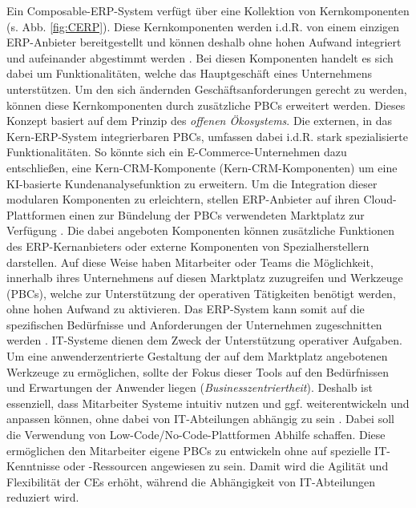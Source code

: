 Ein Composable-ERP-System verfügt über eine Kollektion von Kernkomponenten (s. Abb. \ref{fig:CERP}). Diese Kernkomponenten werden i.d.R. von einem einzigen ERP-Anbieter bereitgestellt und können deshalb ohne hohen Aufwand integriert und aufeinander abgestimmt werden \cite{.d}. Bei diesen Komponenten handelt es sich dabei um Funktionalitäten, welche das Hauptgeschäft eines Unternehmens unterstützen. Um den sich ändernden Geschäftsanforderungen gerecht zu werden, können diese Kernkomponenten durch zusätzliche PBCs erweitert werden. Dieses Konzept basiert auf dem Prinzip des \textit{offenen Ökosystems}. Die externen, in das Kern-ERP-System integrierbaren PBCs, umfassen dabei i.d.R. stark spezialisierte Funktionalitäten. So könnte sich ein E-Commerce-Unternehmen dazu entschließen, eine Kern-\acl{CRM}-Komponente (Kern-CRM-Komponenten) um eine KI-basierte Kundenanalysefunktion zu erweitern. Um die Integration dieser modularen Komponenten zu erleichtern, stellen ERP-Anbieter auf ihren Cloud-Plattformen einen zur Bündelung der PBCs verwendeten Marktplatz zur Verfügung \cite{.d}. Die dabei angeboten Komponenten können zusätzliche Funktionen des ERP-Kern\-anbieters oder externe Komponenten von Spezialherstellern darstellen. Auf diese Weise haben Mitarbeiter oder Teams die Möglichkeit, innerhalb ihres Unternehmens auf diesen Marktplatz zuzugreifen und Werkzeuge (PBCs), welche zur Unterstützung der operativen Tätigkeiten benötigt werden, ohne hohen Aufwand zu aktivieren. Das ERP-System kann somit auf die spezifischen Bedürfnisse und Anforderungen der Unternehmen zugeschnitten werden \cite{.20230313}. IT-Systeme dienen dem Zweck der Unterstützung operativer Aufgaben. Um eine anwenderzentrierte Gestaltung der auf dem Marktplatz angebotenen Werkzeuge zu ermöglichen, sollte der Fokus dieser Tools auf den Bedürfnissen und Erwartungen der Anwender liegen (\textit{Businesszentriertheit}). Deshalb ist essenziell, dass Mitarbeiter Systeme intuitiv nutzen und ggf. weiterentwickeln und anpassen können, ohne dabei von IT-Abteilungen abhängig zu sein \cite{.20230313}. Dabei soll die Verwendung von Low-Code/No-Code-Plattformen Abhilfe schaffen. Diese ermöglichen den Mitarbeiter eigene PBCs zu entwickeln ohne auf spezielle IT-Kenntnisse oder -Ressourcen angewiesen zu sein. Damit wird die Agilität und Flexibilität der CEs erhöht, während die Abhängigkeit von IT-Abteilungen reduziert wird.

